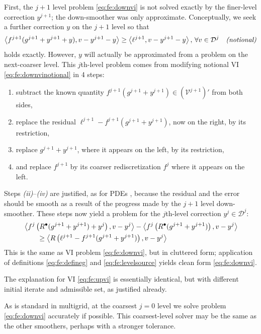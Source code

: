 \documentclass[letterpaper,final,12pt,reqno]{amsart}
\theoremstyle{cstyle}
\theoremstyle{cstyle*}
\theoremstyle{dstyle}
\numberwithin{equation}{section}
\numberwithin{figure}{section}
\numberwithin{table}{section}
\numberwithin{theorem}{section}
\newcommand{\ip}[2]{\left<#1,#2\right>}
\newcommand{\iR}{R^{\bullet}}
\begin{document}
First, the $j+1$ level problem \eqref{eq:fe:downvi} is not solved exactly by the finer-level correction $y^{j+1}$; the down-smoother was only approximate.  Conceptually, we seek a further correction $y$ on the $j+1$ level so that
\begin{equation}
\ip{f^{j+1}(g^{j+1}+y^{j+1}+y)}{v-y^{j+1}-y} \ge \ip{\ell^{j+1}}{v-y^{j+1}-y}, \, \forall v\in \mathcal{D}^j \quad \text{\emph{(notional)}} \label{eq:fe:downvinotional}
\end{equation}
holds exactly.  However, $y$ will actually be approximated from a problem on the next-coarser level.  This $j$th-level problem comes from modifying notional VI \eqref{eq:fe:downvinotional} in 4 steps:
\begin{enumerate}
\item subtract the known quantity $f^{j+1}(g^{j+1}+y^{j+1}) \in (\mathcal{V}^{j+1})'$ from both sides,
\item replace the residual $\ell^{j+1}-f^{j+1}(g^{j+1}+y^{j+1})$, now on the right, by its restriction,
\item replace $g^{j+1}+y^{j+1}$, where it appears on the left, by its restriction,
\item and replace $f^{j+1}$ by its coarser rediscretization $f^j$ where it appears on the left.
\end{enumerate}
Steps \emph{(ii)}--\emph{(iv)} are justified, as for PDEs \cite[subsection 5.3.4, for example]{Trottenbergetal2001}, because the residual and the error should be smooth as a result of the progress made by the $j+1$ level down-smoother.  These steps now yield a problem for the $j$th-level correction $y^j \in \mathcal{D}^j$:
\begin{align}
&\ip{f^j\left(\iR(g^{j+1}+y^{j+1})+y^j\right)}{v-y^j} - \ip{f^j\left(\iR(g^{j+1}+y^{j+1})\right)}{v-y^j} \label{eq:fe:downvicluttered} \\
&\qquad \ge \ip{R\left(\ell^{j+1}-f^{j+1}(g^{j+1}+y^{j+1})\right)}{v-y^j} \notag
\end{align}
This is the same as VI problem \eqref{eq:fe:downvi}, but in cluttered form; application of definitions \eqref{eq:fe:defineg} and \eqref{eq:fe:levelsource} yields clean form \eqref{eq:fe:downvi}.

The explanation for VI \eqref{eq:fe:upvi} is essentially identical, but with different initial iterate and admissible set, as justified already.

As is standard in multigrid, at the coarsest $j=0$ level we solve problem \eqref{eq:fe:downvi} accurately if possible.  This coarsest-level solver may be the same as the other smoothers, perhaps with a stronger tolerance.
\end{document}
